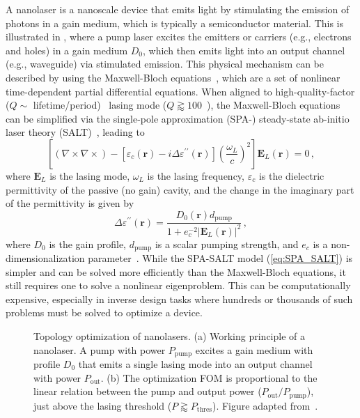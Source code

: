 A nanolaser is a nanoscale device that emits light by stimulating the emission of photons in a gain medium, which is typically a semiconductor material. This is illustrated
in , where a pump laser excites the emitters or carriers (e.g., electrons and holes) in a gain medium $D_0$, which then emits light into an output channel (e.g., waveguide) via
stimulated emission. This physical
mechanism can be described by using the Maxwell-Bloch equations~\cite{haken_laser_dynamics, PhysRev.134.A1429, SALT_original}, which are a set of nonlinear time-dependent 
partial differential equations. When aligned to high-quality-factor ($Q \sim$ lifetime/period)~\cite{phot_crys} lasing mode ($Q\gtrapprox 100$~\cite{cerjan_2016}), the Maxwell-Bloch equations can be simplified via the single-pole approximation (SPA-) steady-state ab-initio laser theory (SALT)~\cite{Ge_2010}, leading to
\begin{equation}\label{eq:SPA_SALT}
    \left[(\nabla \times 
     \nabla \times ) -\left[\varepsilon_c(\mathbf{r})-i \Delta \varepsilon^{\prime \prime} (\mathbf{r})\right] \left(\frac{\omega_L}{c}\right)^2\right] \mathbf{E}_L(\mathbf{r})=0\,,
\end{equation}
where $\mathbf{E}_L$ is the lasing mode, $\omega_L$ is the lasing frequency, $\varepsilon_c$ is the dielectric permittivity of the passive (no gain) cavity, and the change in the 
imaginary part of the permittivity is given by
\begin{equation}\label{eq:gain_SALT}
        \Delta \varepsilon^{\prime \prime} (\mathbf{r}) =  \frac{D_0(\mathbf{r}) d_\text{pump}}{1+ e_c^{-2}\left|\mathbf{E}_L(\mathbf{r})\right|^2}\,,
\end{equation}
where $D_0$ is the gain profile, $d_\text{pump}$ is a scalar pumping strength, and $e_c$ is a non-dimensionalization parameter~\cite{Ge_2010}. While the SPA-SALT model (\eqref{eq:SPA_SALT}) 
is simpler and can be solved more efficiently than the Maxwell-Bloch equations, it still requires one to solve a nonlinear eigenproblem. This can be computationally expensive, especially in 
inverse design tasks where hundreds or thousands of such problems must be solved to optimize a device.

\begin{figure}[tb]
    \centering
    \caption{Topology optimization of nanolasers. (a) Working principle of a nanolaser. A pump with power $P_\text{pump}$ excites a gain medium with profile
    $D_0$ that emits a single lasing mode into an output channel with power $P_\text{out}$. (b) The optimization FOM is proportional to the linear relation between the pump and output power ($P_\text{out}/P_\text{pump}$),
    just above the lasing threshold ($P \gtrapprox P_\text{thres}$).  Figure adapted from~\cite{ownpub4}.}
    \label{fig:laser2d}
\end{figure}

